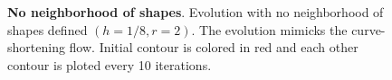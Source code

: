 \documentclass[review]{siamart220329}
\begin{document}
\begin{figure}
	\caption{\textbf{No neighborhood of shapes}. Evolution with no neighborhood of shapes defined $(h=1/8,r=2)$. The evolution mimicks the curve-shortening flow. Initial contour is colored in red and each other contour is ploted every 10 iterations.}
	\label{fig:no-neighborhood-shapes-evolution}
\end{figure}
%
%
%
%
\end{document}
